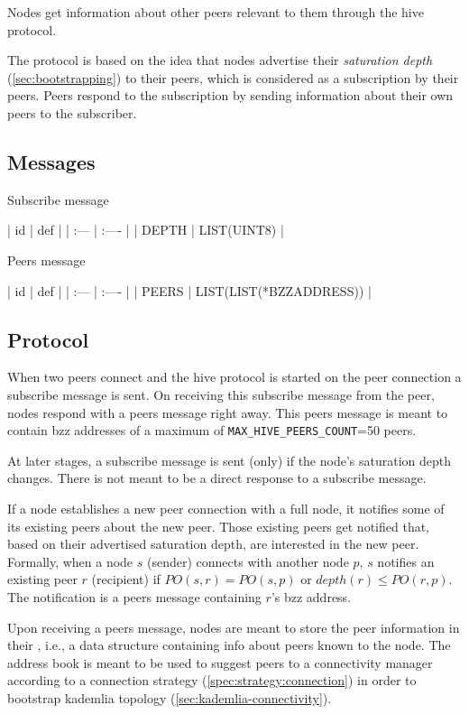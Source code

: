 
Nodes get information about other peers relevant to them through the hive protocol.

The protocol is based on the idea that nodes advertise their \emph{saturation  depth} (\ref{sec:bootstrapping}) to their peers, which is considered as a subscription by their peers. Peers respond to the subscription by sending information about their own peers to the subscriber.

\subsection{Messages}


\begin{definition}{Subscribe message}\label{def:hive-subscribe-msg}

| id | def |
| :--- | :---- |
| DEPTH | LIST(UINT8) |
\end{definition}



\begin{definition}{Peers message}\label{def:hive-peers-msg}

| id | def |
| :--- | :---- |
| PEERS | LIST(LIST(*BZZADDRESS)) |
\end{definition}

\subsection{Protocol}

When two peers connect and the hive protocol is started on the peer connection a subscribe message is sent.
On receiving this subscribe message from the peer, nodes respond with a peers message right away. This peers message is meant to contain bzz addresses of a maximum of \texttt{MAX_HIVE_PEERS_COUNT}=50 peers.

At later stages, a subscribe message is sent (only) if the node's saturation depth changes. There is not meant to be a direct response to a subscribe message.

If a node establishes a new peer connection with a full node, it notifies some of its existing peers about the new peer. Those existing peers get notified that, based on their advertised saturation depth, are interested in the new peer. 
Formally, when a node $s$ (sender) connects with another node $p$, $s$ notifies an existing peer $r$ (recipient) if $\mathit{PO}(s, r) = \mathit{PO}(s, p)$ or $\mathit{depth}(r)\leq \mathit{PO}(r, p)$. The notification is a peers message containing $r$'s bzz address.

Upon receiving a peers message, nodes are meant to store the peer information in their , i.e., a data structure containing info about peers known to the node. The address book is meant to be used to suggest peers  to a connectivity manager according to a connection strategy (\ref{spec:strategy:connection}) in order to bootstrap kademlia topology (\ref{sec:kademlia-connectivity}). 
